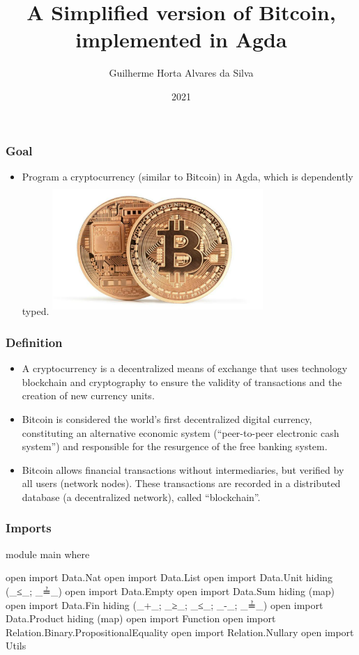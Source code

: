 \documentclass{beamer}
\title{A Simplified version of Bitcoin, \\
    implemented in Agda}
\author[Guilherme]{Guilherme Horta Alvares da Silva}
\date{2021}
\begin{document}
\frame{\titlepage}

\begin{frame}
\frametitle{Goal}
\begin{itemize}
  \item Program a cryptocurrency (similar to Bitcoin) in Agda, which is dependently typed.
    \includegraphics[width=8cm, height=5cm]{TwoBitcoins}
\end{itemize}
\end{frame}

\begin{frame}
   \frametitle{Definition}
\begin{itemize}
     \item A cryptocurrency is a decentralized means of exchange that uses technology
       blockchain and cryptography to ensure the validity of transactions and the creation of new currency units.
     \item Bitcoin is considered the world's first decentralized digital currency,
       constituting an alternative economic system (\foreignquote{english}{peer-to-peer electronic cash system})
       and responsible for the resurgence of the free banking system.
       \cite{nakamoto2008bitcoin}
     \item Bitcoin allows financial transactions without intermediaries,
       but verified by all users (network nodes).
       These transactions are recorded in a distributed database (a decentralized network),
       called \foreignquote{english}{blockchain}.
     \end{itemize}
\end{frame}

\begin{frame}
  \frametitle{Imports}
\begin{code}

module main where

open import Data.Nat
open import Data.List
open import Data.Unit hiding (_≤_; _≟_)
open import Data.Empty
open import Data.Sum hiding (map)
open import Data.Fin hiding (_+_; _≥_; _≤_; _-_; _≟_)
open import Data.Product hiding (map)
open import Function
open import Relation.Binary.PropositionalEquality
open import Relation.Nullary
open import Utils

\end{code}
\end{frame}
\end{document}
